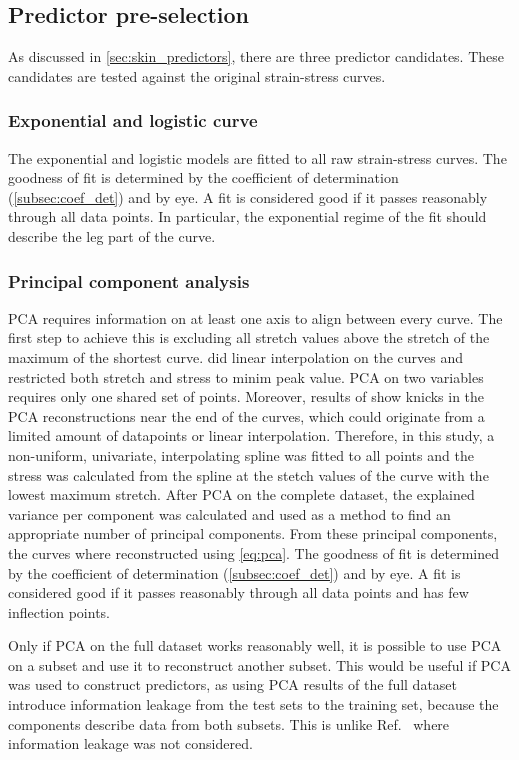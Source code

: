 \subsection{Predictor pre-selection}
As discussed in \cref{sec:skin_predictors}, there are three predictor candidates.
These candidates are tested against the original strain-stress curves.

\subsubsection{Exponential and logistic curve}
The exponential and logistic models are fitted to all raw strain-stress curves.
The goodness of fit is determined by the coefficient of determination (\cref{subsec:coef_det}) and by eye.
A fit is considered good if it passes reasonably through all data points.
In particular, the exponential regime of the fit should describe the leg part of the curve.

\subsubsection{Principal component analysis}
PCA requires information on at least one axis to align between every curve.
The first step to achieve this is excluding all stretch values above the stretch of the maximum of the shortest curve.
\textcite{Soylu2022} did linear interpolation on the curves and restricted both stretch and stress to minim peak value.
PCA on two variables requires only one shared set of points.
Moreover, results of \citeauthor{Soylu2022} show knicks in the PCA reconstructions near the end of the curves, which could originate from a limited amount of datapoints or linear interpolation.
Therefore, in this study, a non-uniform, univariate, interpolating spline was fitted to all points and the stress was calculated from the spline at the stetch values of the curve with the lowest maximum stretch.
After PCA on the complete dataset, the explained variance per component was calculated and used as a method to find an appropriate number of principal components.
From these principal components, the curves where reconstructed using \cref{eq:pca}.
The goodness of fit is determined by the coefficient of determination (\cref{subsec:coef_det}) and by eye.
A fit is considered good if it passes reasonably through all data points and has few inflection points.

Only if PCA on the full dataset works reasonably well, it is possible to use PCA on a subset and use it to reconstruct another subset.
This would be useful if PCA was used to construct predictors, as using PCA results of the full dataset introduce information leakage from the test sets to the training set, because the components describe data from both subsets.
This is unlike Ref.~\cite{Soylu2022} where information leakage was not considered.

